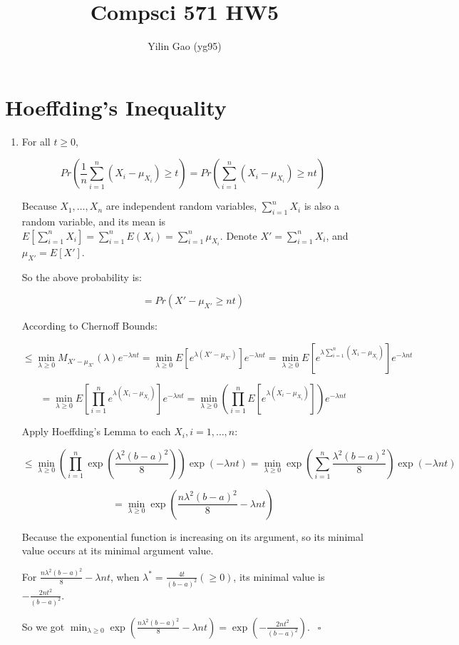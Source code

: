 \documentclass[paper=letter, fontsize=12pt]{article}
\title{Compsci 571 HW5}
\author{Yilin Gao (yg95)}
\begin{document}
\maketitle
\section{Hoeffding's Inequality}

\begin{enumerate}[label=(\alph*)]
	\item 
	For all $t \geq 0$,
	
	$$Pr(\frac{1}{n}\sum_{i=1}^{n}(X_i-\mu_{X_i})\geq t) = Pr(\sum_{i =1}^{n} (X_i - \mu_{X_i}) \geq nt)$$
	
	Because $X_1, \dots, X_n$ are independent random variables, $\sum_{i = 1}^{n} X_i$ is also a random variable, and its mean is $E[\sum_{i = 1}^{n} X_i] = \sum_{i = 1}^{n} E(X_i) = \sum_{i = 1}^{n} \mu_{X_i}$. Denote $X' = \sum_{i = 1}^{n} X_i$, and $\mu_{X'} = E[X']$.
	
	So the above probability is:
	
	$$ = Pr(X' - \mu_{X'} \geq nt)$$

	According to Chernoff Bounds:
	
	$$\leq \min_{\lambda \geq 0} M_{X' - \mu_{X'}} (\lambda) e^{-\lambda nt} = \min_{\lambda \geq 0} E[e^{\lambda (X' - \mu_{X'})}] e^{-\lambda nt} = \min_{\lambda \geq 0} E[e^{\lambda \sum_{i = 1}^{n}(X_i - \mu_{X_i})}] e^{-\lambda nt}$$	
	
	$$= \min_{\lambda \geq 0} E[\prod_{i = 1}^{n} e^{\lambda (X_i - \mu_{X_i})}] e^{-\lambda nt} = \min_{\lambda \geq 0} (\prod_{i = 1}^{n} E[e^{\lambda (X_i - \mu_{X_i})}]) e^{-\lambda nt}$$
	
	Apply Hoeffding's Lemma to each $X_i, i = 1, \dots, n$:
	
	$$\leq \min_{\lambda \geq 0} ( \prod_{i = 1}^{n} \exp(\frac{\lambda^2 (b-a)^2}{8})) \exp(-\lambda nt) = \min_{\lambda \geq 0} \exp(\sum_{i = 1}^{n} \frac{\lambda^2(b-a)^2}{8}) \exp(-\lambda nt)$$
	
	$$= \min_{\lambda \geq 0} \exp(\frac{n \lambda^2 (b-a)^2}{8} - \lambda nt)$$
	
	Because the exponential function is increasing on its argument, so its minimal value occurs at its minimal argument value.
	
	For $\frac{n \lambda^2 (b-a)^2}{8} - \lambda nt$, when $\lambda^* = \frac{4t}{(b-a)^2} (\geq 0)$, its minimal value is $- \frac{2nt^2}{(b-a)^2}$.
	
	So we got $\min_{\lambda \geq 0} \exp(\frac{n \lambda^2 (b-a)^2}{8} - \lambda nt) = \exp(- \frac{2nt^2}{(b-a)^2})$. $\ \ \square$
	

\end{enumerate}
\end{document}
